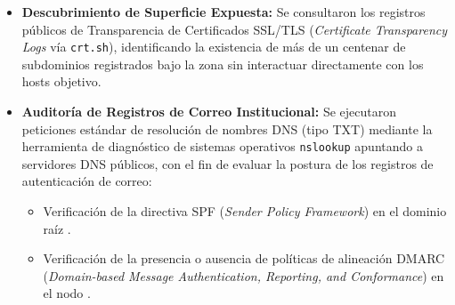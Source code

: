 
\begin{itemize}[itemsep=1.5pt,topsep=1.5pt,parsep=0pt,partopsep=0pt]
    \item \textbf{Descubrimiento de Superficie Expuesta:} Se consultaron los registros públicos de Transparencia de Certificados SSL/TLS (\textit{Certificate Transparency Logs} vía \texttt{crt.sh}), identificando la existencia de más de un centenar de subdominios registrados bajo la zona  sin interactuar directamente con los hosts objetivo.
    
    \item \textbf{Auditoría de Registros de Correo Institucional:} Se ejecutaron peticiones estándar de resolución de nombres DNS (tipo TXT) mediante la herramienta de diagnóstico de sistemas operativos \texttt{nslookup} apuntando a servidores DNS públicos, con el fin de evaluar la postura de los registros de autenticación de correo:
    \begin{itemize}[itemsep=1pt,topsep=1pt,parsep=0pt,partopsep=0pt]
        \item Verificación de la directiva SPF (\textit{Sender Policy Framework}) en el dominio raíz .
        \item Verificación de la presencia o ausencia de políticas de alineación DMARC (\textit{Domain-based Message Authentication, Reporting, and Conformance}) en el nodo .
    \end{itemize}
\end{itemize}


